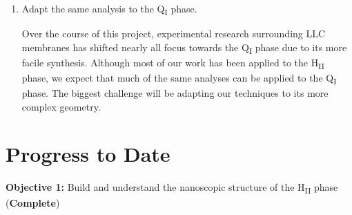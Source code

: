 \documentclass{article}
\begin{document}
\begin{enumerate}
    \item Adapt the same analysis to the Q\textsubscript{I} phase.
    
    Over the course of this project, experimental research surrounding
    LLC membranes has shifted nearly all focus towards the Q\textsubscript{I}
    phase due to its more facile synthesis.	Although most of our work has 
    been applied to the H\textsubscript{II} phase, we expect that much of 
    the same analyses can be applied to the Q\textsubscript{I} phase. The 
    biggest challenge will be adapting our techniques to its more complex
    geometry.
    
%    
    
  \end{enumerate}

  \section{Progress to Date}\label{section:progress}
  
  \textbf{\large Objective 1:} {\large Build and understand the nanoscopic structure
  of the H\textsubscript{II} phase} (\textcolor{green!40!olive}{\textbf{Complete}})
  
\end{document}
